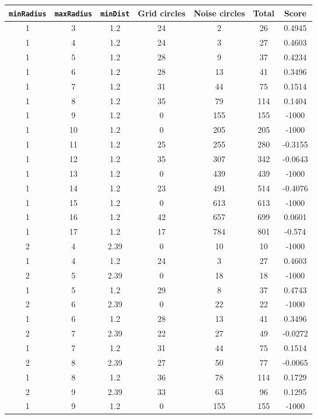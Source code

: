 \documentclass[letterpaper, 12pt]{article}
\begin{document}
\begin{longtable}{|c|c|c|c|c|c|c|}
\hline
\textbf{\texttt{minRadius}} & \textbf{\texttt{maxRadius}} & \textbf{\texttt{minDist}} & \textbf{Grid circles} & \textbf{Noise circles} & \textbf{Total} & \textbf{Score} \\
\hline
1 & 3 & 1.2 & 24 & 2 & 26 & 0.4945 \\
\hline
1 & 4 & 1.2 & 24 & 3 & 27 & 0.4603 \\
\hline
1 & 5 & 1.2 & 28 & 9 & 37 & 0.4234 \\
\hline
1 & 6 & 1.2 & 28 & 13 & 41 & 0.3496 \\
\hline
1 & 7 & 1.2 & 31 & 44 & 75 & 0.1514 \\
\hline
1 & 8 & 1.2 & 35 & 79 & 114 & 0.1404 \\
\hline
1 & 9 & 1.2 & 0 & 155 & 155 & -1000 \\
\hline
1 & 10 & 1.2 & 0 & 205 & 205 & -1000 \\
\hline
1 & 11 & 1.2 & 25 & 255 & 280 & -0.3155 \\
\hline
1 & 12 & 1.2 & 35 & 307 & 342 & -0.0643 \\
\hline
1 & 13 & 1.2 & 0 & 439 & 439 & -1000 \\
\hline
1 & 14 & 1.2 & 23 & 491 & 514 & -0.4076 \\
\hline
1 & 15 & 1.2 & 0 & 613 & 613 & -1000 \\
\hline
1 & 16 & 1.2 & 42 & 657 & 699 & 0.0601 \\
\hline
1 & 17 & 1.2 & 17 & 784 & 801 & -0.574 \\
\hline
2 & 4 & 2.39 & 0 & 10 & 10 & -1000 \\
\hline
1 & 4 & 1.2 & 24 & 3 & 27 & 0.4603 \\
\hline
2 & 5 & 2.39 & 0 & 18 & 18 & -1000 \\
\hline
1 & 5 & 1.2 & 29 & 8 & 37 & 0.4743 \\
\hline
2 & 6 & 2.39 & 0 & 22 & 22 & -1000 \\
\hline
1 & 6 & 1.2 & 28 & 13 & 41 & 0.3496 \\
\hline
2 & 7 & 2.39 & 22 & 27 & 49 & -0.0272 \\
\hline
1 & 7 & 1.2 & 31 & 44 & 75 & 0.1514 \\
\hline
2 & 8 & 2.39 & 27 & 50 & 77 & -0.0065 \\
\hline
1 & 8 & 1.2 & 36 & 78 & 114 & 0.1729 \\
\hline
2 & 9 & 2.39 & 33 & 63 & 96 & 0.1295 \\
\hline
1 & 9 & 1.2 & 0 & 155 & 155 & -1000 \\

\end{longtable}
\end{document}
